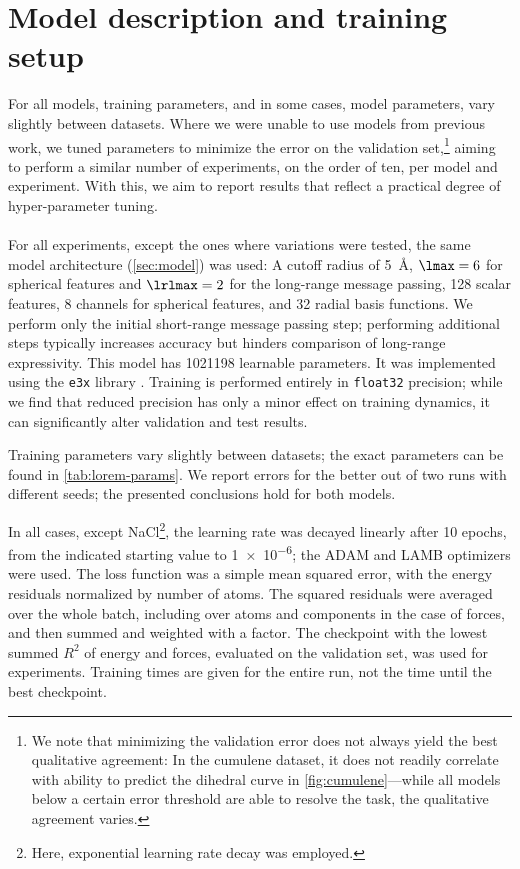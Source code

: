 \documentclass[10pt]{article}
\begin{document}
\section{Model description and training setup}
\label{sec:apx-models}

For all models, training parameters, and in some cases, model parameters, vary slightly between datasets. Where we were unable to use models from previous work, we tuned parameters to minimize the error on the validation set,\footnote{We note that minimizing the validation error does not always yield the best qualitative agreement: In the cumulene dataset, it does not readily correlate with ability to predict the dihedral curve in \cref{fig:cumulene}---while all models below a certain error threshold are able to resolve the task, the qualitative agreement varies.} aiming to perform a similar number of experiments, on the order of ten, per model and experiment. With this, we aim to report results that reflect a practical degree of hyper-parameter tuning.

\paragraph{\lorem}
For all experiments, except the ones where variations were tested, the same \lorem model  architecture (\cref{sec:model}) was used: A cutoff radius of \qty{5}{\angstrom}, $\lmax=6$ for spherical features and $\lrlmax=2$ for the long-range message passing, \num{128} scalar features, \num{8} channels for spherical features, and \num{32} radial basis functions. We perform only the initial short-range message passing step; performing additional steps typically increases accuracy but hinders comparison of long-range expressivity. This model has \num{1021198} learnable parameters. It was implemented using the \texttt{e3x} library \citep{um2024}.
Training is performed entirely in \texttt{float32} precision; while we find that reduced precision has only a minor effect on training dynamics, it can significantly alter validation and test results.

Training parameters vary slightly between datasets; the exact parameters can be found in \cref{tab:lorem-params}. We report errors for the better out of two runs with different seeds; the presented conclusions hold for both models.

In all cases, except NaCl\footnote{Here, exponential learning rate decay was employed.}, the learning rate was decayed linearly after 10 epochs, from the indicated starting value to \num{1e-6}; the ADAM \citep{kb2017} and LAMB \citep{ylrhkbsdkh2019} optimizers were used. The loss function was a simple mean squared error, with the energy residuals normalized by number of atoms. The squared residuals were averaged over the whole batch, including over atoms and components in the case of forces, and then summed and weighted with a factor. The checkpoint with the lowest summed $R^2$ of energy and forces, evaluated on the validation set, was used for experiments. Training times are given for the entire run, not the time until the best checkpoint.
\end{document}
